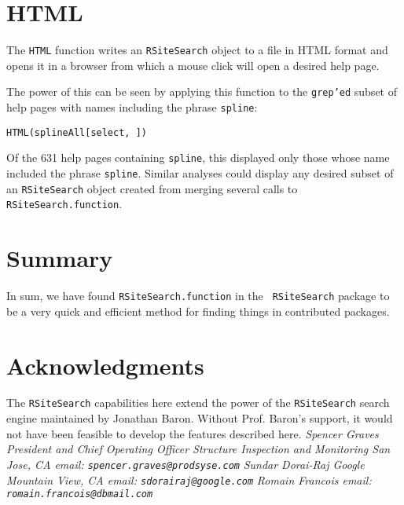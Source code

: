 \section*{HTML}
The {\tt HTML} function writes an {\tt RSiteSearch} object to a file
in HTML format and opens it in a browser from which a mouse click will
open a desired help page.

The power of this can be seen by applying this function to the
{\tt grep'ed} subset of help pages with names including the phrase
{\tt spline}:

\begin{verbatim}
HTML(splineAll[select, ])
\end{verbatim}

Of the 631 help pages containing {\tt spline}, this displayed only
those whose name included the phrase {\tt spline}.  Similar analyses
could display any desired subset of an {\tt RSiteSearch} object
created from merging several calls to {\tt RSiteSearch.function}.

\section*{Summary}
In sum, we have found {\tt RSiteSearch.function} in the {\tt
RSiteSearch} package to be a very quick and efficient method for
finding things in contributed packages.

\section*{Acknowledgments}
The {\tt RSiteSearch} capabilities here extend the power of the
{\tt RSiteSearch} search engine maintained by Jonathan Baron.
Without Prof. Baron's support, it would not have been feasible
to develop the features described here.
\newline \newline
\emph{Spencer Graves \newline
President and Chief Operating Officer \newline
Structure Inspection and Monitoring \newline
San Jose, CA \newline
email:  {\tt spencer.graves@prodsyse.com} }
\newline \newline
\emph{Sundar Dorai-Raj \newline
Google \newline
Mountain View, CA \newline
email:  {\tt sdorairaj@google.com} }
\newline \newline
\emph{Romain Francois \newline
\newline
\newline
email:  {\tt romain.francois@dbmail.com} }

